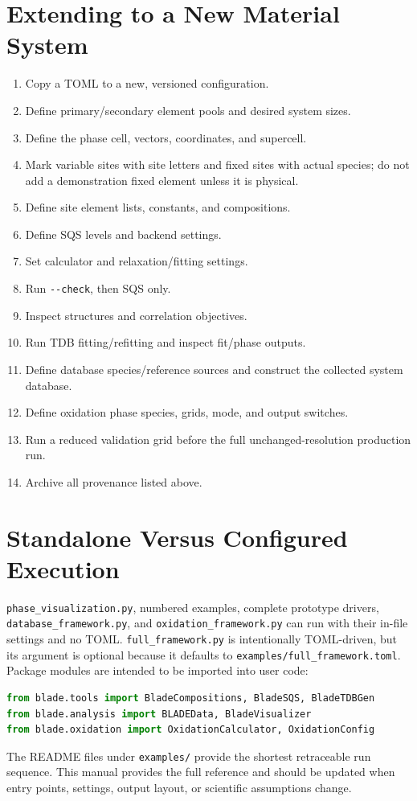 \documentclass[11pt,letterpaper]{article}
\newcommand{\file}[1]{\nolinkurl{#1}}
\begin{document}
\section{Extending to a New Material System}

\begin{enumerate}
  \item Copy a TOML to a new, versioned configuration.
  \item Define primary/secondary element pools and desired system sizes.
  \item Define the phase cell, vectors, coordinates, and supercell.
  \item Mark variable sites with site letters and fixed sites with actual
  species; do not add a demonstration fixed element unless it is physical.
  \item Define site element lists, constants, and compositions.
  \item Define SQS levels and backend settings.
  \item Set calculator and relaxation/fitting settings.
  \item Run \file{--check}, then SQS only.
  \item Inspect structures and correlation objectives.
  \item Run TDB fitting/refitting and inspect fit/phase outputs.
  \item Define database species/reference sources and construct the collected
  system database.
  \item Define oxidation phase species, grids, mode, and output switches.
  \item Run a reduced validation grid before the full unchanged-resolution
  production run.
  \item Archive all provenance listed above.
\end{enumerate}

\section{Standalone Versus Configured Execution}

\file{phase_visualization.py}, numbered examples, complete prototype drivers,
\file{database_framework.py}, and \file{oxidation_framework.py} can run with
their in-file settings and no TOML. \file{full_framework.py} is intentionally
TOML-driven, but its argument is optional because it defaults to
\file{examples/full_framework.toml}. Package modules are intended to be
imported into user code:
\begin{lstlisting}[language=Python]
from blade.tools import BladeCompositions, BladeSQS, BladeTDBGen
from blade.analysis import BLADEData, BladeVisualizer
from blade.oxidation import OxidationCalculator, OxidationConfig
\end{lstlisting}

The README files under \file{examples/} provide the shortest retraceable run
sequence. This manual provides the full reference and should be updated when
entry points, settings, output layout, or scientific assumptions change.
\end{document}
